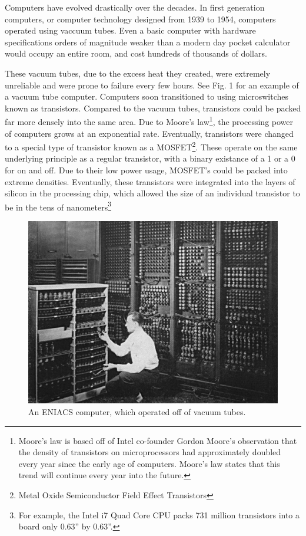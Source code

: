 \documentclass[10pt,journal,compsoc]{IEEEtran}
\begin{document}
Computers have evolved drastically over the decades. In first generation computers, or computer technology designed from 1939 to 1954, computers operated using vaccuum tubes. Even a basic computer with hardware specifications orders of magnitude weaker than a modern day pocket calculator would occupy an entire room, and cost hundreds of thousands of dollars\cite{URI}.



These vacuum tubes, due to the excess heat they created, were extremely unreliable and were prone to failure every few hours. See Fig. 1 for an example of a vacuum tube computer. Computers soon transitioned to using microswitches known as transistors.  Compared to the vacuum tubes, transistors could be packed far more densely into the same area. Due to Moore's law\footnote{Moore's law is based off of Intel co-founder Gordon Moore's observation that the density of transistors on microprocessors had approximately doubled every year since the early age of computers. Moore's law states that this trend will continue every year into the future.}, the processing power of computers grows at an exponential rate\cite{Moore}. Eventually, transistors were changed to a special type of transistor known as a MOSFET\footnote{Metal Oxide Semiconductor Field Effect Transistors}. These operate on the same underlying principle as a regular transistor, with a binary existance of a 1 or a 0 for on and off. Due to their low power usage, MOSFET's could be packed into extreme densities. Eventually, these transistors were integrated into the layers of silicon in the processing chip, which allowed the size of an individual transistor to be in the tens of nanometers\cite{Tom's}\footnote{For example, the Intel i7 Quad Core CPU packs 731 million transistors into a board only 0.63'' by 0.63''.}

\begin{figure}
	\centering
	\includegraphics[width=0.7\linewidth]{eniacsvacuum}
	\caption[]{An ENIACS computer, which operated off of vacuum tubes.}
	\label{fig:eniacsvacuum}
\end{figure}
\end{document}
